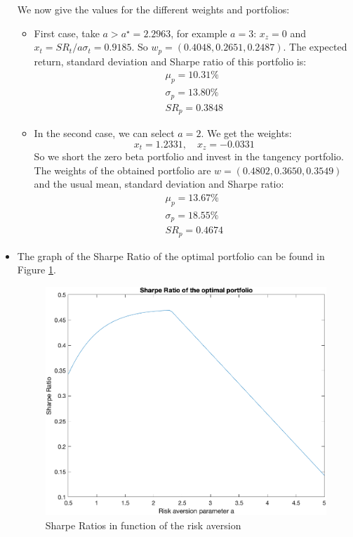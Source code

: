 \documentclass[10pt]{article}
\newenvironment{exercise}[2][Exercise]{\begin{trivlist}
  \item[\hskip \labelsep {\bfseries #1}\hskip \labelsep {\bfseries #2.}]}{\end{trivlist}}
\begin{document}
\begin{exercise}{1}
\begin{itemize}
We now give the values for the different weights and portfolios: 
\begin{itemize}
  \item First case, take $a > a^\star = 2.2963$, for example $a = 3$: $x_z = 0$ and $x_t = SR_t/a\sigma_t = 0.9185$. So $w_p = (0.4048, 0.2651, 0.2487)$. The expected return, standard deviation and Sharpe ratio of this portfolio is: 
  \begin{align*}
    \mu_p = 10.31\% \\
    \sigma_p = 13.80\% \\
    SR_p = 0.3848
  \end{align*}
  \item In the second case, we can select $a = 2$. We get the weights: 
   $$ x_t = 1.2331, \quad x_z = -0.0331$$
   So we short the zero beta portfolio and invest in the tangency portfolio. The weights of the obtained portfolio are $w = (0.4802, 0.3650, 0.3549)$ and the usual mean, standard deviation and Sharpe ratio: 
   \begin{align*}
    \mu_p = 13.67\%\\
    \sigma_p = 18.55\% \\
    SR_p = 0.4674
   \end{align*} 
\end{itemize}
  \item The graph of the Sharpe Ratio of the optimal portfolio can be found in Figure \ref{SR}.
  \begin{figure}[H]
    \centering
    \includegraphics[scale = 0.8]{Figures/SharpeRatio.png}
    \caption{Sharpe Ratios in function of the risk aversion}
    \label{SR}
  \end{figure}
  
  
  \end{itemize}

\end{exercise}
\end{document}
